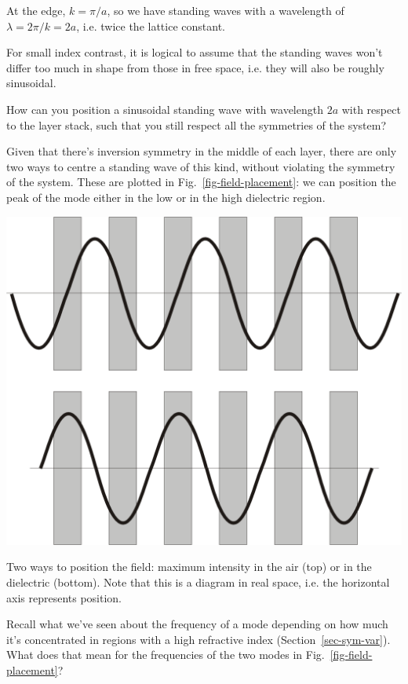 At the edge, $k=\pi / a$, so we have standing waves with a wavelength of $\lambda = 2 \pi / k = 2a$, i.e. twice the lattice constant.

For small index contrast, it is logical to assume that the standing waves won't differ too much in shape from those in free space, i.e. they will also be roughly sinusoidal.

\begin{cue}
How can you position a sinusoidal standing wave with wavelength $2a$ with respect to the layer stack, such that you still respect all the symmetries of the system?
\end{cue}

Given that there's inversion symmetry in the middle of each layer, there are only two ways to centre a standing wave of this kind, without violating the symmetry of the system. These are plotted in Fig.~\ref{fig-field-placement}: we can position the peak of the mode either in the low or in the high dielectric region.

\begin{marginfigure}
\centering
\includegraphics{symmetry/figures/field_placement}
\caption{Two ways to position the field: maximum intensity in the air (top) or in the dielectric (bottom). Note that this is a diagram in real space, i.e. the horizontal axis represents position.}
\label{fig-field-placement}
\end{marginfigure}

\begin{cue}
Recall what we've seen about the frequency of a mode depending on how much it's concentrated in regions with a high refractive index (Section~\ref{sec-sym-var}). What does that mean for the frequencies of the two modes in Fig.~\ref{fig-field-placement}?
\end{cue}

